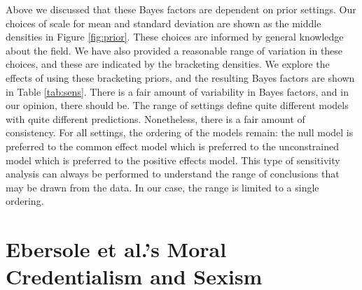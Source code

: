 \documentclass[english,man]{apa6}
\theoremstyle{definition}
\theoremstyle{definition}
\theoremstyle{definition}
\theoremstyle{remark}
\begin{document}
Above we discussed that these Bayes factors are dependent on prior
settings. Our choices of scale for mean and standard deviation are shown
as the middle densities in Figure \ref{fig:prior}. These choices are
informed by general knowledge about the field. We have also provided a
reasonable range of variation in these choices, and these are indicated
by the bracketing densities. We explore the effects of using these
bracketing priors, and the resulting Bayes factors are shown in Table
\ref{tab:sens}. There is a fair amount of variability in Bayes factors,
and in our opinion, there should be. The range of settings define quite
different models with quite different predictions. Nonetheless, there is
a fair amount of consistency. For all settings, the ordering of the
models remain: the null model is preferred to the common effect model
which is preferred to the unconstrained model which is preferred to the
positive effects model. This type of sensitivity analysis can always be
performed to understand the range of conclusions that may be drawn from
the data. In our case, the range is limited to a single ordering.

\section{Ebersole et al.'s Moral Credentialism and
Sexism}\label{ebersole-et-al.s-moral-credentialism-and-sexism}
\end{document}
